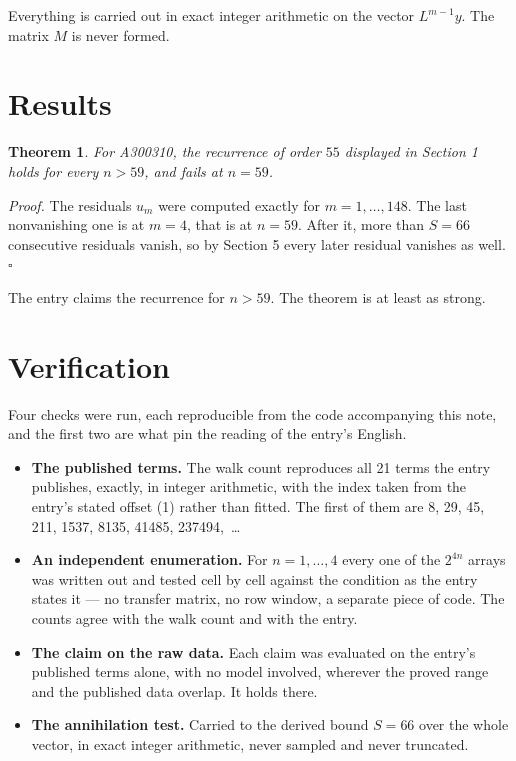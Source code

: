 \documentclass[11pt]{article}
\newtheorem{theorem}{Theorem}
\theoremstyle{definition}
\begin{document}
Everything is carried out in exact integer arithmetic on the vector $L^{m-1}y$. The matrix $M$ is never formed.

\section{Results}

\begin{theorem} For A300310, the recurrence of order $55$ displayed in Section 1 holds for every $n > 59$, and fails at $n = 59$.\end{theorem}

{\itshape Proof.} The residuals $u_m$ were computed exactly for $m = 1,\dots,148$. The last nonvanishing one is at $m = 4$, that is at $n = 59$. After it, more than $S = 66$ consecutive residuals vanish, so by Section 5 every later residual vanishes as well. $\square$

The entry claims the recurrence for $n > 59$. The theorem is at least as strong.

\section{Verification}

Four checks were run, each reproducible from the code accompanying this note, and the first two are what pin the reading of the entry's English.

\begin{itemize}

\item {\bfseries The published terms.} The walk count reproduces all 21 terms the entry publishes, exactly, in integer arithmetic, with the index taken from the entry's stated offset (1) rather than fitted. The first of them are 8, 29, 45, 211, 1537, 8135, 41485, 237494,~\dots

\item {\bfseries An independent enumeration.} For $n = 1,\dots,4$ every one of the $2^{4n}$ arrays was written out and tested cell by cell against the condition as the entry states it --- no transfer matrix, no row window, a separate piece of code. The counts agree with the walk count and with the entry.

\item {\bfseries The claim on the raw data.} Each claim was evaluated on the entry's published terms alone, with no model involved, wherever the proved range and the published data overlap. It holds there.

\item {\bfseries The annihilation test.} Carried to the derived bound $S = 66$ over the whole vector, in exact integer arithmetic, never sampled and never truncated.

\end{itemize}
\end{document}
